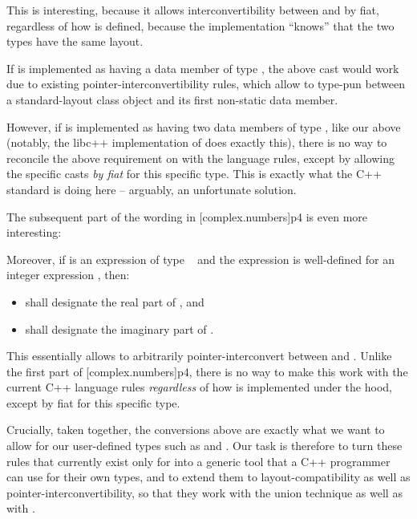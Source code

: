 This is interesting, because it allows interconvertibility between  and  by fiat, regardless of how  is defined, because the implementation ``knows'' that the two types have the same layout. 

If  is implemented as having a data member of type , the above cast would work due to existing pointer-interconvertibility rules, which allow to type-pun between a standard-layout class object and its first non-static data member. 

However, if  is implemented as having two data members of type , like our  above (notably, the libc++ implementation of  does exactly this), there is no way to reconcile the above requirement on  with the language rules, except by allowing the specific casts \emph{by fiat} for this specific type. This is exactly what the C++ standard is doing here -- arguably, an unfortunate solution.

The subsequent part of the wording in [complex.numbers]p4 is even more interesting:

\begin{adjustwidth}{0.9cm}{0.9cm}
Moreover, if  is an expression of type \cv{}~ and the expression  is well-defined for an integer expression , then:

\begin{itemize}
\item {} shall designate the real part of , and
\item {} shall designate the imaginary part of .
\end{itemize}
\end{adjustwidth}

This essentially allows to arbitrarily pointer-interconvert between  and . Unlike the first part of [complex.numbers]p4, there is no way to make this work with the current C++ language rules \emph{regardless} of how  is implemented under the hood, except by fiat for this specific type.

Crucially, taken together, the conversions above are exactly what we want to allow for our user-defined types such as  and . Our task is therefore to turn these rules that currently exist only for  into a generic tool that a C++ programmer can use for their own types, and to extend them to layout-compatibility as well as pointer-interconvertibility, so that they work with the union technique as well as with .


